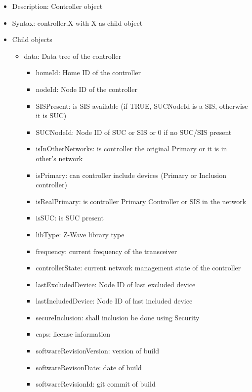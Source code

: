 \begin {itemize}
\item Description: Controller object
\item Syntax: controller.X with  X as child object
\item Child objects
\begin {itemize}
\item data: Data tree of the controller
\begin {itemize}
\item  homeId: Home ID of the controller
\item  nodeId: Node ID of the controller
\item  SISPresent: is SIS available (if TRUE, SUCNodeId is a SIS, otherwise it is SUC)
\item  SUCNodeId: Node ID of SUC or SIS or 0 if no SUC/SIS present
\item  isInOtherNetworks: is controller the original Primary or it is in other's network
\item  isPrimary: can controller include devices (Primary or Inclusion controller)
\item  isRealPrimary: is controller Primary Controller or SIS in the network
\item  isSUC: is SUC present
\item  libType: Z-Wave library type
\item  frequency: current frequency of the transceiver

\item  controllerState: current network management state of the controller
\item  lastExcludedDevice: Node ID of last excluded device
\item  lastIncludedDevice: Node ID of last included device
\item  secureInclusion: shall inclusion be done using Security

\item  caps: \zway license information
\item  softwareRevisionVersion: version of \zway build
\item  softwareRevisonDate: date of \zway build
\item  softwareRevisionId: git commit of \zway build


\end{itemize}
\end{itemize}
\end{itemize}
